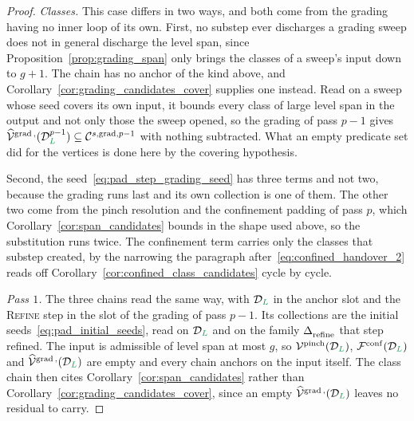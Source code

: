 \documentclass[a4paper, 12pt]{article}
\makeatletter
\newcommand{\robert}[1]{{\color{orange} #1}}
\DeclareRobustCommand{\gradeClasses}[1][]{\widehat{\V}^{\mathrm{grad} \, \ifx\@empty#1\@empty\else,#1\fi}}
\DeclareRobustCommand{\candC}[1][]{\mathcal{C}^{s\ifx\@empty#1\@empty\else,#1\fi}}
\newcommand{\green}{\color{ForestGreen}}
\newcommand{\V}{\mathcal{V}}
\newcommand{\F}{\mathcal{F}}
\DeclareRobustCommand{\simplexsubsetTwo}[2][]{\Delta\ifx\@empty#1\@empty\else^{#1}\fi_{#2}}
\renewcommand{\L}{{\green L}}
\theoremstyle{definition}
\theoremstyle{plain}
\numberwithin{equation}{section}
\newcommand{\tobecut}[1]{{\color{red} #1}}     %
\DeclareRobustCommand{\domseq}[1][]{\mathcal{D}\ifx\@empty#1\@empty\else_{#1}\fi}
\makeatother
\begin{document}
\begin{proof}
    \emph{Classes.} This case differs in two ways, and both come from the grading having no inner loop of its own. First, \tobecut{no substep ever discharges}\robert{a grading sweep does not in general discharge} the level span, since Proposition~\ref{prop:grading_span} only brings the classes of a sweep's input down to $g \! + \! 1$. The chain has no anchor of the kind above, and Corollary~\ref{cor:grading_candidates_cover} supplies one instead. Read on a sweep whose seed covers its own input, it bounds every class of large level span in the output and not only those the sweep opened, so the grading of pass $p \! - \! 1$ gives $\gradeClasses(\domseq[\L]^{p-1}) \subseteq \candC[\mathrm{grad},p-1]$ with nothing subtracted. What an empty predicate set did for the vertices is done here by the covering hypothesis.

    Second, the seed~\eqref{eq:pad_step_grading_seed} has three terms and not two, because the grading runs last and its own collection is one of them. The other two come from the pinch resolution and the confinement padding of pass $p$, which Corollary~\ref{cor:span_candidates} bounds in the shape used above, so the substitution runs twice. The confinement term carries only the classes that substep created, by the narrowing the paragraph after~\eqref{eq:confined_handover_2} reads off Corollary~\ref{cor:confined_class_candidates} cycle by cycle.

    \emph{Pass $1$.} The three chains read the same way, with $\domseq[\L]$ in the anchor slot and the \textsc{Refine} step in the slot of the grading of pass $p \! - \! 1$. Its collections are the initial seeds~\eqref{eq:pad_initial_seeds}, read on $\domseq[\L]$ and on the family $\simplexsubsetTwo{\mathrm{refine}}$ that step refined. The input is admissible of level span at most $g$, so $\V^{\mathrm{pinch}}(\domseq[\L])$, $\F^{\mathrm{conf}}(\domseq[\L])$ and $\gradeClasses(\domseq[\L])$ are empty and every chain anchors on the input itself. The class chain then cites Corollary~\ref{cor:span_candidates} rather than Corollary~\ref{cor:grading_candidates_cover}, since an empty $\gradeClasses(\domseq[\L])$ leaves no residual to carry.
\end{proof}
\end{document}
